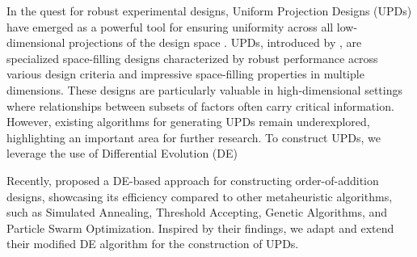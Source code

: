 \documentclass [PhD] {package/uclathes}
\begin{document}
 In the quest for robust experimental designs, Uniform Projection Designs (UPDs) have emerged as a powerful tool for ensuring uniformity across all low-dimensional projections of the design space \parencite{sun2019uniform}. UPDs, introduced by \textcite{sun2019uniform}, are specialized space-filling designs characterized by robust performance across various design criteria and impressive space-filling properties in multiple dimensions. These designs are particularly valuable in high-dimensional settings where relationships between subsets of factors often carry critical information. However, existing algorithms for generating UPDs remain underexplored, highlighting an important area for further research. To construct UPDs, we leverage the use of Differential Evolution (DE)%

 

Recently, \textcite{stokes2023metaheuristic} proposed a DE-based approach for constructing order-of-addition designs, showcasing its efficiency compared to other metaheuristic algorithms, such as Simulated Annealing, Threshold Accepting, Genetic Algorithms, and Particle Swarm Optimization. Inspired by their findings, we adapt and extend their modified DE algorithm for the construction of UPDs. 
\end{document}
